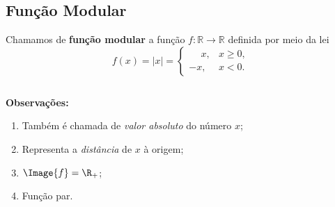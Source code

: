 \subsection{Função Modular}
\begin{frame}
  \begin{definition}
    Chamamos de \textbf{função modular} a função $f:\mathbb{R}\rightarrow\mathbb{R}$ definida por meio da lei
    \begin{equation*}
      f(x) = |x| = \begin{cases}
        \phantom{-}x, & x \geq 0,\\
        -x, & x < 0.
      \end{cases}
    \end{equation*}
  \end{definition}
  \begin{columns}[onlytextwidth]
    \begin{column}{0.49\textwidth}
      \begin{highlight}
        \textbf{Observações:}
        \begin{enumerate}
          \item Também é chamada de \emph{valor absoluto} do número $x$;
          \item Representa a \emph{distância} de $x$ à origem;
          \item $\Image{f}=\R_{+}$;
          \item Função par.
        \end{enumerate}
      \end{highlight}
    \end{column}
    \begin{column}{0.49\textwidth}
      \vspace{-0.6cm}
      \begin{figure}
      \end{figure}
    \end{column}
  \end{columns}
\end{frame}

